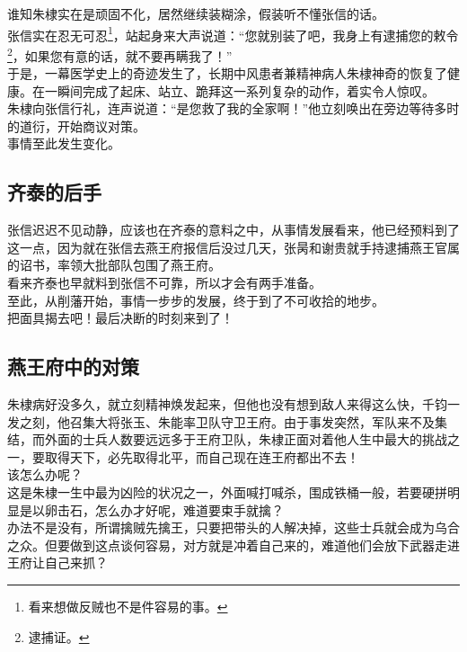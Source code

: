 \begin{multicols}{\theparacolNo}
谁知朱棣实在是顽固不化，居然继续装糊涂，假装听不懂张信的话。\\

张信实在忍无可忍\footnote{看来想做反贼也不是件容易的事。}，站起身来大声说道：“您就别装了吧，我身上有逮捕您的敕令\footnote{逮捕证。}，如果您有意的话，就不要再瞒我了！”\\

于是，一幕医学史上的奇迹发生了，长期中风患者兼精神病人朱棣神奇的恢复了健康。在一瞬间完成了起床、站立、跪拜这一系列复杂的动作，着实令人惊叹。\\

朱棣向张信行礼，连声说道：“是您救了我的全家啊！”他立刻唤出在旁边等待多时的道衍，开始商议对策。\\

事情至此发生变化。\\

\subsection{齐泰的后手}
张信迟迟不见动静，应该也在齐泰的意料之中，从事情发展看来，他已经预料到了这一点，因为就在张信去燕王府报信后没过几天，张昺和谢贵就手持逮捕燕王官属的诏书，率领大批部队包围了燕王府。\\

看来齐泰也早就料到张信不可靠，所以才会有两手准备。\\

至此，从削藩开始，事情一步步的发展，终于到了不可收拾的地步。\\

把面具揭去吧！最后决断的时刻来到了！\\

\subsection{燕王府中的对策}
朱棣病好没多久，就立刻精神焕发起来，但他也没有想到敌人来得这么快，千钧一发之刻，他召集大将张玉、朱能率卫队守卫王府。由于事发突然，军队来不及集结，而外面的士兵人数要远远多于王府卫队，朱棣正面对着他人生中最大的挑战之一，要取得天下，必先取得北平，而自己现在连王府都出不去！\\

该怎么办呢？\\

这是朱棣一生中最为凶险的状况之一，外面喊打喊杀，围成铁桶一般，若要硬拼明显是以卵击石，怎么办才好呢，难道要束手就擒？\\

办法不是没有，所谓擒贼先擒王，只要把带头的人解决掉，这些士兵就会成为乌合之众。但要做到这点谈何容易，对方就是冲着自己来的，难道他们会放下武器走进王府让自己来抓？\\


\end{multicols}

